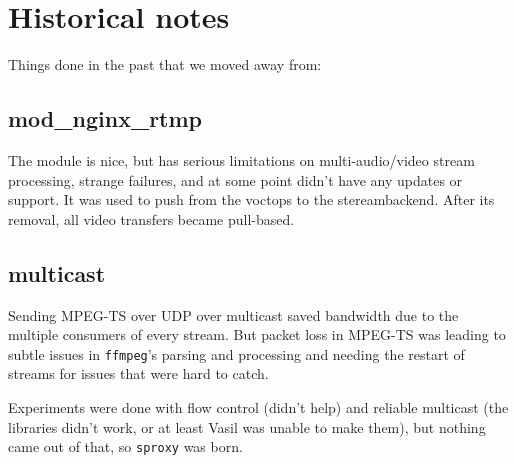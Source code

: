 \documentclass{article}
\begin{document}
\section{Historical notes}

Things done in the past that we moved away from:

\subsection{mod\_nginx\_rtmp}

The module is nice, but has serious limitations on multi-audio/video stream
processing, strange failures, and at some point didn't have any updates or
support. It was used to push from the voctops to the stereambackend. After its
removal, all video transfers became pull-based.

\subsection{multicast}

Sending MPEG-TS over UDP over multicast saved bandwidth due to the multiple
consumers of every stream. But packet loss in MPEG-TS was leading to subtle
issues in \texttt{ffmpeg}'s parsing and processing and needing the restart of
streams for issues that were hard to catch.

Experiments were done with flow control (didn't help) and reliable multicast
(the libraries didn't work, or at least Vasil was unable to make them), but
nothing came out of that, so \texttt{sproxy} was born.
\end{document}
